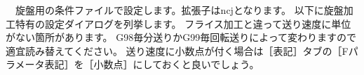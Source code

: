 

\vspace*{1zh}
　旋盤用の条件ファイルで設定します。拡張子はncjとなります。
以下に旋盤加工特有の設定ダイアログを列挙します。
フライス加工と違って送り速度に単位がない箇所があります。
G98毎分送りかG99毎回転送りによって変わりますので適宜読み替えてください。
送り速度に小数点が付く場合は［表記］タブの［Fパラメータ表記］を［小数点］にしておくと良いでしょう。




